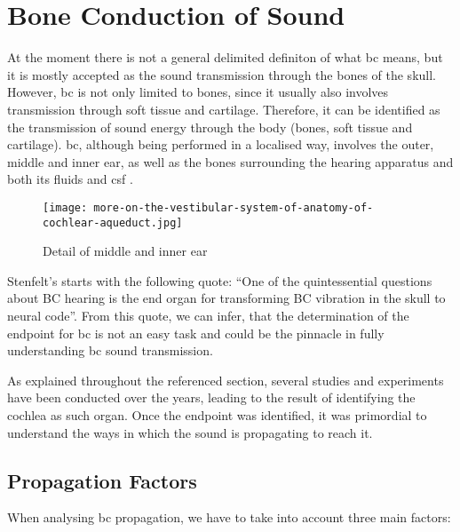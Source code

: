 \section{Bone Conduction of Sound}\label{sec:bonepaths}
At the moment there is not a general delimited definiton of what \gls{bc} means, but it is mostly accepted as the sound transmission through the bones of the skull. However, \gls{bc} is not only limited to bones, since it usually also involves transmission through soft tissue and cartilage. Therefore, it can be identified as the transmission of sound energy through the body (bones, soft tissue and cartilage). 
\gls{bc}, although being performed in a localised way, involves the outer, middle and inner ear, as well as the bones surrounding the hearing apparatus and both its fluids and \gls{csf} \citep{puria_2013}.
 \begin{figure}[H]
	\centering
		\texttt{[image: more-on-the-vestibular-system-of-anatomy-of-cochlear-aqueduct.jpg]}
		\caption{Detail of middle and inner ear}
		\label{fig:hearing_system_detail}
\end{figure}
Stenfelt's \citep[section 6.1.1]{puria_2013} starts with the following quote: \enquote{One of the quintessential questions about BC hearing is the end organ for
transforming BC vibration in the skull to neural code}. From this quote, we can infer, that the determination of the endpoint for \gls{bc} is not an easy task and could be the pinnacle in fully understanding \gls{bc} sound transmission.

As explained throughout the referenced section, several studies and experiments have been conducted over the years, leading to the result of identifying the cochlea as such organ. Once the endpoint was identified, it was primordial to understand the ways in which the sound is propagating to reach it.
\subsection{Propagation Factors}

When analysing \gls{bc} propagation, we have to take into account three main factors:

